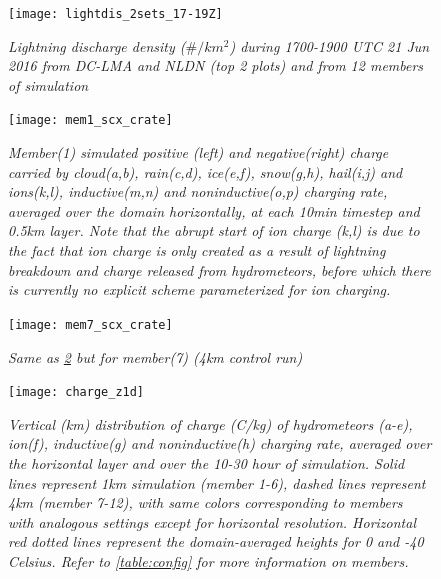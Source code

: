 \begin{figure}[H]
\centering
\texttt{[image: lightdis\_2sets\_17-19Z]}
\singlespacing
\vspace{-10pt}
\caption{\textit{Lightning discharge density ($\#/km^2$) during 1700-1900 UTC 21 Jun 2016 from DC-LMA and NLDN (top 2 plots) and from 12 members of simulation}}
\label{fig:lightdis17_19}
\end{figure}

\begin{figure}[H]
\centering
\texttt{[image: mem1\_scx\_crate]}
\singlespacing
\vspace{-10pt}
\caption{\textit{Member(1) simulated positive (left) and negative(right) charge carried by cloud(a,b), rain(c,d), ice(e,f), snow(g,h), hail(i,j) and ions(k,l), inductive(m,n) and noninductive(o,p) charging rate, averaged over the domain horizontally, at each 10min timestep and 0.5km layer. Note that the abrupt start of ion charge (k,l) is due to the fact that ion charge is only created as a result of lightning breakdown and charge released from hydrometeors, before which there is currently no explicit scheme parameterized for ion charging.}}
\label{fig:mem1_charge}
\end{figure}

\begin{figure}[H]
\centering
\texttt{[image: mem7\_scx\_crate]}
\singlespacing
\vspace{-10pt}
\caption{\textit{Same as \ref{fig:mem1_charge} but for member(7) (4km control run)}}
\label{fig:mem7_charge}
\end{figure}


\begin{figure}[H]
\centering
\vspace{-20pt}
\texttt{[image: charge\_z1d]}
\singlespacing
\caption{\textit{Vertical (km) distribution of charge (C/kg) of hydrometeors (a-e), ion(f), inductive(g) and noninductive(h) charging rate, averaged over the horizontal layer and over the 10-30 hour of simulation. Solid lines represent 1km simulation (member 1-6), dashed lines represent 4km (member 7-12), with same colors corresponding to members with analogous settings except for horizontal resolution. Horizontal red dotted lines represent the domain-averaged heights for 0 and -40 Celsius. Refer to \ref{table:config} for more information on members.}}
\label{fig:charge_z1d}
\end{figure}

